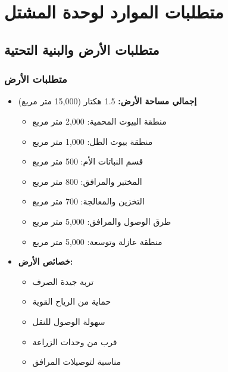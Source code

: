 \section{متطلبات الموارد لوحدة المشتل}

\subsection{متطلبات الأرض والبنية التحتية}

\subsubsection{متطلبات الأرض}
\begin{itemize}
    \item \textbf{إجمالي مساحة الأرض:} 1.5 هكتار (15,000 متر مربع)
    \begin{itemize}
        \item منطقة البيوت المحمية: 2,000 متر مربع
        \item منطقة بيوت الظل: 1,000 متر مربع
        \item قسم النباتات الأم: 500 متر مربع
        \item المختبر والمرافق: 800 متر مربع
        \item التخزين والمعالجة: 700 متر مربع
        \item طرق الوصول والمرافق: 5,000 متر مربع
        \item منطقة عازلة وتوسعة: 5,000 متر مربع
    \end{itemize}
    
    \item \textbf{خصائص الأرض:}
    \begin{itemize}
        \item تربة جيدة الصرف
        \item حماية من الرياح القوية
        \item سهولة الوصول للنقل
        \item قرب من وحدات الزراعة
        \item مناسبة لتوصيلات المرافق
    \end{itemize}
\end{itemize}

